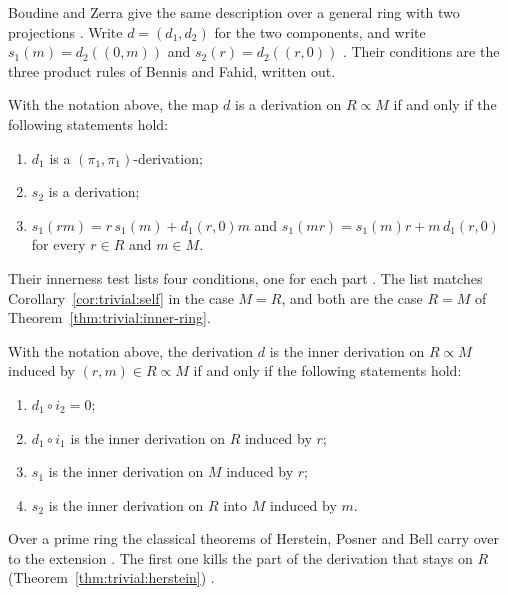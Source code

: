 Boudine and Zerra give the same description over a general ring with two
projections \cite[p.~461]{BoudineZerra2024}. Write $d=(d_{1},d_{2})$ for the two
components, and write $s_{1}(m)=d_{2}((0,m))$ and $s_{2}(r)=d_{2}((r,0))$
\cite[p.~461]{BoudineZerra2024}. Their conditions are the three product rules of
Bennis and Fahid, written out.

\begin{theorem}\label{thm:trivial:components}
With the notation above, the map $d$ is a derivation on $R\propto M$ if and only if
the following statements hold:
\begin{enumerate}[label=(\arabic*)]
\item $d_{1}$ is a $(\pi_{1},\pi_{1})$-derivation;
\item $s_{2}$ is a derivation;
\item $s_{1}(rm)=r\,s_{1}(m)+d_{1}(r,0)m$ and $s_{1}(mr)=s_{1}(m)r+m\,d_{1}(r,0)$
for every $r\in R$ and $m\in M$.
\end{enumerate}
\end{theorem}

Their innerness test lists four conditions, one for each part
\cite[p.~463]{BoudineZerra2024}. The list matches Corollary~\ref{cor:trivial:self} in
the case $M=R$, and both are the case $R=M$ of
Theorem~\ref{thm:trivial:inner-ring}.

\begin{theorem}\label{thm:trivial:inner-ring}
With the notation above, the derivation $d$ is the inner derivation on
$R\propto M$ induced by $(r,m)\in R\propto M$ if and only if the following
statements hold:
\begin{enumerate}[label=(\arabic*)]
\item $d_{1}\circ i_{2}=0$;
\item $d_{1}\circ i_{1}$ is the inner derivation on $R$ induced by $r$;
\item $s_{1}$ is the inner derivation on $M$ induced by $r$;
\item $s_{2}$ is the inner derivation on $R$ into $M$ induced by $m$.
\end{enumerate}
\end{theorem}

Over a prime ring the classical theorems of Herstein, Posner and Bell carry over to
the extension \cite[p.~467]{BoudineZerra2024}. The first one kills the part of the
derivation that stays on $R$ (Theorem~\ref{thm:trivial:herstein}) \cite[p.~467]{BoudineZerra2024}.

